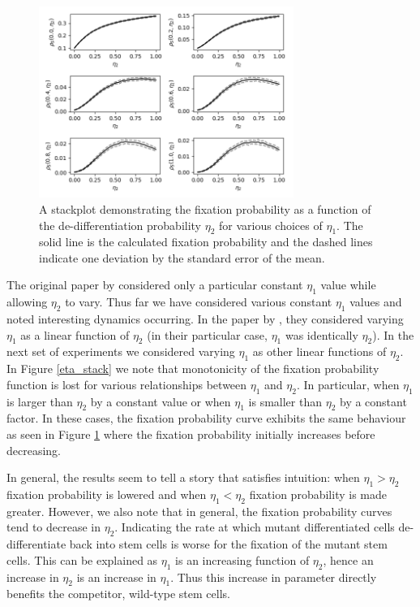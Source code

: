 \documentclass[12pt]{article}
\begin{document}
\begin{figure}[H]
\begin{center}
\includegraphics[width=0.74\textwidth]{constant_eta1_stackplot.png}
\end{center}
\caption{A stackplot demonstrating the fixation probability as a function of the de-differentiation probability $\eta_2$ for various choices of $\eta_1$. The solid line is the calculated fixation probability and the dashed lines indicate one deviation by the standard error of the mean.}\label{constantEta1Stack}
\end{figure}

The original paper by \cite{mohammad} considered only a particular constant $\eta_1$ value while allowing $\eta_2$ to vary. Thus far we have considered various constant $\eta_1$ values and noted interesting dynamics occurring. In the paper by \cite{wodarz}, they considered varying $\eta_1$ as a linear function of $\eta_2$ (in their particular case, $\eta_1$ was identically $\eta_2$). In the next set of experiments we considered varying $\eta_1$ as other linear functions of $\eta_2$. In Figure \ref{eta_stack} we note that monotonicity of the fixation probability function is lost for various relationships between $\eta_1$ and $\eta_2$. In particular, when $\eta_1$ is larger than $\eta_2$ by a constant value or when $\eta_1$ is smaller than $\eta_2$ by a constant factor. In these cases, the fixation probability curve exhibits the same behaviour as seen in Figure \ref{constantEta1Stack} where the fixation probability initially increases before decreasing. 

In general, the results seem to tell a story that satisfies intuition: when $\eta_1>\eta_2$ fixation probability is lowered and when $\eta_1<\eta_2$ fixation probability is made greater. However, we also note that in general, the fixation probability curves tend to decrease in $\eta_2$. Indicating the rate at which mutant differentiated cells de-differentiate back into stem cells is worse for the fixation of the mutant stem cells. This can be explained as $\eta_1$ is an increasing function of $\eta_2$, hence an increase in $\eta_2$ is an increase in $\eta_1$. Thus this increase in parameter directly benefits the competitor, wild-type stem cells. 
\end{document}
